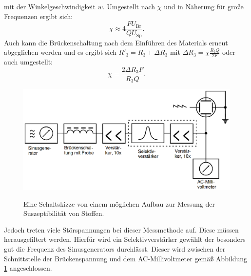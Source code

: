 mit der Winkelgeschwindigkeit $w$. Umgestellt nach $\chi$ und in Näherung für große Frequenzen ergibt sich:
\begin{equation}
	\chi\approx 4\frac{F U_\text{Br}}{Q U_\text{Sp}}\text{.}\label{eq:SusU}
\end{equation}
Auch kann die Brückenschaltung nach dem Einführen des Materials erneut abgeglichen werden und es ergibt sich $R'_3 = R_3 + \Delta R_3 $ mit $\Delta R_3 = \chi \frac{R_3 Q}{2 F}$ oder auch umgestellt:
\begin{equation}
	\chi = \frac{2 \Delta R_3 F}{R_3 Q}\text{.}\label{eq:SusR}
\end{equation}
\begin{figure}
	\centering
	\caption{Eine Schaltskizze von einem möglichen Aufbau zur Messung der Suszeptibilität von Stoffen.}
	\includegraphics[width=\linewidth-70pt,height=\textheight-70pt,keepaspectratio]{content/images/Schaltskizze.png}
	\label{fig:Schaltskizze}
\end{figure}
Jedoch treten viele Störspannungen bei dieser Messmethode auf. Diese müssen herausgefiltert werden. Hierfür wird ein Selektivverstärker gewählt der besonders gut die Frequenz des Sinusgenerators durchlässt. Dieser wird zwischen der Schnittstelle der Brückenspannung und dem AC-Millivoltmeter gemäß Abbildung \ref{fig:Schaltskizze} angeschlossen.
